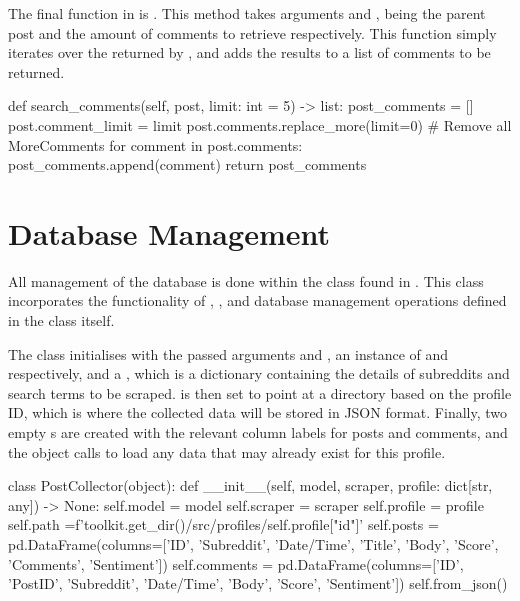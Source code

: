 The final function in  is . This method takes arguments  and , being the parent post and the amount of comments to retrieve respectively. This function simply iterates over the  returned by , and adds the results to a list of comments to be returned.

\begin{python}
def search_comments(self, post, limit: int = 5) -> list:
post_comments = []
    post.comment_limit = limit
    post.comments.replace_more(limit=0) # Remove all MoreComments
    for comment in post.comments:
        post_comments.append(comment)
    return post_comments
\end{python}

\section{Database Management}
All management of the database is done within the  class found in . This class incorporates the functionality of , , and database management operations defined in the class itself.

The class initialises with the passed arguments  and , an instance of  and  respectively, and a , which is a dictionary containing the details of subreddits and search terms to be scraped.  is then set to point at a directory based on the profile ID, which is where the collected data will be stored in JSON format. Finally, two empty s are created with the relevant column labels for posts and comments, and the object calls  to load any data that may already exist for this profile.

\begin{python}
class PostCollector(object):
    def __init__(self, model, scraper, profile: dict[str, any]) -> None:
        self.model = model
        self.scraper = scraper
        self.profile = profile
        self.path =f'{toolkit.get_dir()}/src/profiles/{self.profile["id"]}'
        self.posts = pd.DataFrame(columns=['ID', 'Subreddit', 'Date/Time', 'Title', 'Body', 'Score', 'Comments', 'Sentiment'])
        self.comments = pd.DataFrame(columns=['ID', 'PostID', 'Subreddit', 'Date/Time', 'Body', 'Score', 'Sentiment'])
        self.from_json()
\end{python}


